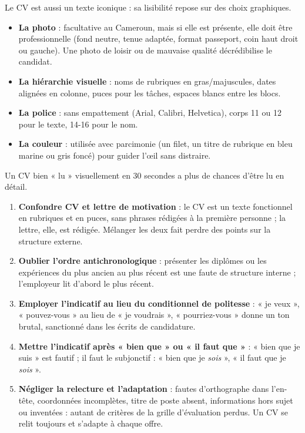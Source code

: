 \documentclass[11pt]{article}
\newcommand{\cle}[1]{{\popxbold\color{popdark}#1}}
\begin{document}
\begin{aretenir}
Le CV est aussi un \cle{texte iconique} : sa lisibilité repose sur des choix graphiques.
\begin{itemize}
\item \textbf{La photo} : facultative au Cameroun, mais si elle est présente, elle doit être professionnelle (fond neutre, tenue adaptée, format passeport, coin haut droit ou gauche). Une photo de loisir ou de mauvaise qualité décrédibilise le candidat.
\item \textbf{La hiérarchie visuelle} : noms de rubriques en gras/majuscules, dates alignées en colonne, puces pour les tâches, espaces blancs entre les blocs.
\item \textbf{La police} : sans empattement (Arial, Calibri, Helvetica), corps 11 ou 12 pour le texte, 14-16 pour le nom.
\item \textbf{La couleur} : utilisée avec parcimonie (un filet, un titre de rubrique en bleu marine ou gris foncé) pour guider l'œil sans distraire.
\end{itemize}
Un CV bien « lu » visuellement en 30 secondes a plus de chances d'être lu en détail.
\end{aretenir}

\begin{attention}
\begin{enumerate}
\item \textbf{Confondre CV et lettre de motivation} : le CV est un texte fonctionnel en rubriques et en puces, sans phrases rédigées à la première personne ; la lettre, elle, est rédigée. Mélanger les deux fait perdre des points sur la structure externe.
\item \textbf{Oublier l'ordre antichronologique} : présenter les diplômes ou les expériences du plus ancien au plus récent est une faute de structure interne ; l'employeur lit d'abord le plus récent.
\item \textbf{Employer l'indicatif au lieu du conditionnel de politesse} : « je veux », « pouvez-vous » au lieu de « je voudrais », « pourriez-vous » donne un ton brutal, sanctionné dans les écrits de candidature.
\item \textbf{Mettre l'indicatif après « bien que » ou « il faut que »} : « bien que je suis » est fautif ; il faut le subjonctif : « bien que je \emph{sois} », « il faut que je \emph{sois} ».
\item \textbf{Négliger la relecture et l'adaptation} : fautes d'orthographe dans l'en-tête, coordonnées incomplètes, titre de poste absent, informations hors sujet ou inventées : autant de critères de la grille d'évaluation perdus. Un CV se relit toujours et s'adapte à chaque offre.
\end{enumerate}
\end{attention}
\end{document}
